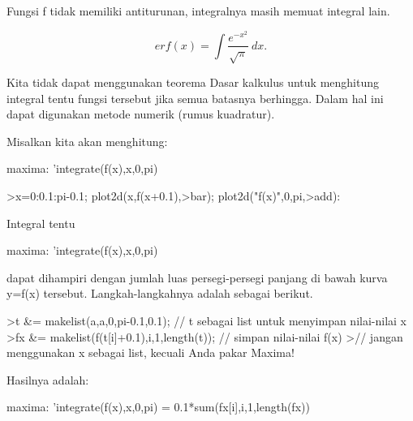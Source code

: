\documentclass[a4paper,10pt]{article}
\begin{document}
\begin{eulernotebook}
\begin{eulercomment}
\begin{eulercomment}
\begin{eulercomment}
\begin{eulercomment}
\begin{eulercomment}
\begin{eulercomment}
\begin{eulercomment}
\begin{eulercomment}
\begin{eulercomment}
\begin{eulercomment}
\begin{eulercomment}
\begin{eulercomment}
\begin{eulercomment}
\begin{eulercomment}
\begin{eulercomment}
\begin{eulercomment}
\begin{eulercomment}
\begin{eulercomment}
\begin{eulercomment}
\begin{eulercomment}
\begin{eulercomment}
\begin{eulercomment}
\begin{euleroutput}
\end{euleroutput}
\begin{eulercomment}
Fungsi f tidak memiliki antiturunan, integralnya masih memuat integral
lain.

\end{eulercomment}
\begin{eulerformula}
\[
erf(x) = \int \frac{e^{-x^2}}{\sqrt{\pi}} \ dx.
\]
\end{eulerformula}
\begin{eulercomment}
Kita tidak dapat menggunakan teorema Dasar kalkulus untuk menghitung
integral tentu fungsi tersebut jika semua batasnya berhingga. Dalam
hal ini dapat digunakan metode numerik (rumus kuadratur).

Misalkan kita akan menghitung:

maxima: 'integrate(f(x),x,0,pi)
\end{eulercomment}
\begin{eulerprompt}
>x=0:0.1:pi-0.1; plot2d(x,f(x+0.1),>bar); plot2d("f(x)",0,pi,>add):
\end{eulerprompt}
\begin{eulercomment}
Integral tentu

maxima: 'integrate(f(x),x,0,pi)

dapat dihampiri dengan jumlah luas persegi-persegi panjang di bawah
kurva y=f(x) tersebut. Langkah-langkahnya adalah sebagai berikut.
\end{eulercomment}
\begin{eulerprompt}
>t &= makelist(a,a,0,pi-0.1,0.1); // t sebagai list untuk menyimpan nilai-nilai x
>fx &= makelist(f(t[i]+0.1),i,1,length(t)); // simpan nilai-nilai f(x)
>// jangan menggunakan x sebagai list, kecuali Anda pakar Maxima!
\end{eulerprompt}
\begin{eulercomment}
Hasilnya adalah:

maxima: 'integrate(f(x),x,0,pi) = 0.1*sum(fx[i],i,1,length(fx))


\end{eulercomment}
\end{eulercomment}
\end{eulercomment}
\end{eulercomment}
\end{eulercomment}
\end{eulercomment}
\end{eulercomment}
\end{eulercomment}
\end{eulercomment}
\end{eulercomment}
\end{eulercomment}
\end{eulercomment}
\end{eulercomment}
\end{eulercomment}
\end{eulercomment}
\end{eulercomment}
\end{eulercomment}
\end{eulercomment}
\end{eulercomment}
\end{eulercomment}
\end{eulercomment}
\end{eulercomment}
\end{eulercomment}
\end{eulernotebook}
\end{document}

